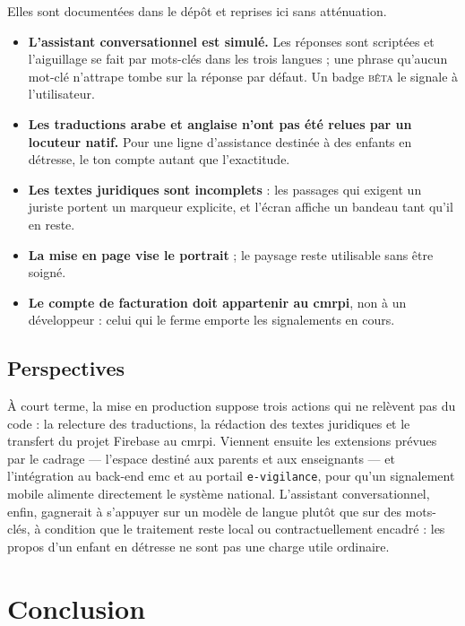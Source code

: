 \documentclass[11pt,a4paper,oneside,openany]{report}
\begin{document}
Elles sont documentées dans le dépôt et reprises ici sans atténuation.

\begin{itemize}
\item \textbf{L'assistant conversationnel est simulé.} Les réponses sont
scriptées et l'aiguillage se fait par mots-clés dans les trois langues ; une
phrase qu'aucun mot-clé n'attrape tombe sur la réponse par défaut. Un badge
\textsc{bêta} le signale à l'utilisateur.
\item \textbf{Les traductions arabe et anglaise n'ont pas été relues par un
locuteur natif.} Pour une ligne d'assistance destinée à des enfants en détresse,
le ton compte autant que l'exactitude.
\item \textbf{Les textes juridiques sont incomplets} : les passages qui exigent
un juriste portent un marqueur explicite, et l'écran affiche un bandeau tant
qu'il en reste.
\item \textbf{La mise en page vise le portrait} ; le paysage reste utilisable
sans être soigné.
\item \textbf{Le compte de facturation doit appartenir au \gls{cmrpi}}, non à un
développeur : celui qui le ferme emporte les signalements en cours.
\end{itemize}

\section{Perspectives}

À court terme, la mise en production suppose trois actions qui ne relèvent pas
du code : la relecture des traductions, la rédaction des textes juridiques et le
transfert du projet Firebase au \gls{cmrpi}. Viennent ensuite les extensions
prévues par le cadrage — l'espace destiné aux parents et aux enseignants — et
l'intégration au back-end \gls{emc} et au portail \texttt{e-vigilance}, pour
qu'un signalement mobile alimente directement le système national. L'assistant
conversationnel, enfin, gagnerait à s'appuyer sur un modèle de langue plutôt que
sur des mots-clés, à condition que le traitement reste local ou contractuellement
encadré : les propos d'un enfant en détresse ne sont pas une charge utile
ordinaire.

\chapter*{Conclusion}
\end{document}

